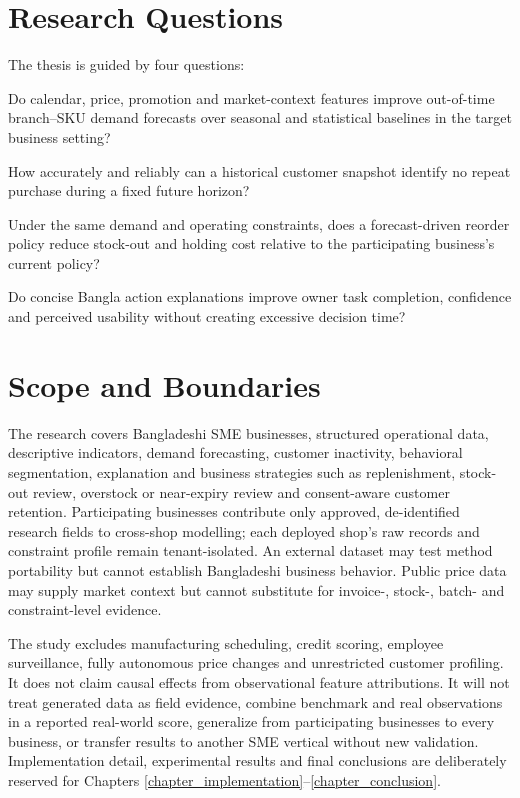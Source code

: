 \section{Research Questions}

The thesis is guided by four questions:

\begin{description}[style=nextline,leftmargin=2em]
  \item[RQ1.] Do calendar, price, promotion and market-context features improve
  out-of-time branch--SKU demand forecasts over seasonal and statistical
  baselines in the target business setting?
  \item[RQ2.] How accurately and reliably can a historical customer snapshot
  identify no repeat purchase during a fixed future horizon?
  \item[RQ3.] Under the same demand and operating constraints, does a
  forecast-driven reorder policy reduce stock-out and holding cost relative to
  the participating business's current policy?
  \item[RQ4.] Do concise Bangla action explanations improve owner task
  completion, confidence and perceived usability without creating excessive
  decision time?
\end{description}

\section{Scope and Boundaries}

The research covers Bangladeshi SME businesses, structured operational data,
descriptive indicators, demand forecasting, customer inactivity, behavioral
segmentation, explanation and business strategies such as
replenishment, stock-out review, overstock or near-expiry review and
consent-aware customer retention. Participating businesses contribute only
approved, de-identified research fields to cross-shop modelling; each deployed
shop's raw records and constraint profile remain tenant-isolated. An external
dataset may test method portability but cannot establish Bangladeshi business
behavior. Public price data may supply market context but cannot substitute for
invoice-, stock-, batch- and constraint-level evidence.

The study excludes manufacturing scheduling, credit scoring, employee surveillance, fully
autonomous price changes and unrestricted customer profiling. It does not claim
causal effects from observational feature attributions. It will not treat
generated data as field evidence, combine benchmark and real observations in a
reported real-world score, generalize from participating businesses to every
business, or transfer results to another SME vertical without new validation.
Implementation detail, experimental results and final conclusions are
deliberately reserved for Chapters
\ref{chapter_implementation}--\ref{chapter_conclusion}.

